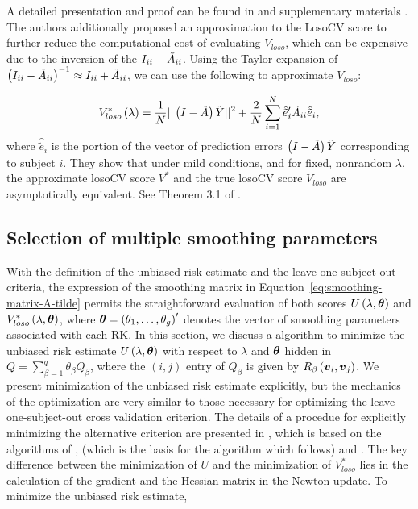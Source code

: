 A detailed presentation and proof can be found in \citet{xu2012asymptotic} and supplementary materials \citet{xuasymptotic}.  The authors additionally proposed an approximation to the LosoCV score to further reduce the computational cost of evaluating $V_{loso}$, which can be expensive due to the inversion of the $I_{ii} - \tilde{A}_{ii}$. Using the Taylor expansion of $\left(I_{ii} - \tilde{A}_{ii}\right)^{-1} \approx I_{ii} + \tilde{A}_{ii}$, we can use the following to approximate $V_{loso}$:

\begin{equation} \label{eq:approx-losocv}
V_{loso}^*\left( \lambda \right) = \frac{1}{N} \vert \vert \left(I - \tilde{A}\right)\tilde{Y} \vert \vert^2 + \frac{2}{N} \sum_{i = 1}^N \hat{\tilde{e}}'_{i}\tilde{A}_{ii}\hat{\tilde{e}}_i,
\end{equation}
\noindent
where $\hat{\tilde{e}}_i$ is the portion of the vector of prediction errors $\left(I - \tilde{A}\right)\tilde{Y}$ corresponding to subject $i$. They show that under mild conditions, and for fixed, nonrandom $\lambda$, the approximate losoCV score $V^*$ and the true losoCV score $V_{loso}$ are asymptotically equivalent. See Theorem 3.1 of \citet{xu2012asymptotic}.
  
\vspace{0.8in} 


\subsection{Selection of multiple smoothing parameters}

With the definition of the unbiased risk estimate and the leave-one-subject-out criteria, the expression of the smoothing matrix in Equation~\ref{eq:smoothing-matrix-A-tilde} permits the straightforward evaluation of both scores $U\left(\lambda, \mbox{\boldmath $\theta$} \right)$ and $V_{loso}^*\left(\lambda, \mbox{\boldmath $\theta$} \right)$, where $\mbox{\boldmath $\theta$} = \left(\theta_1,\dots, \theta_g\right)'$ denotes the vector of smoothing parameters associated with each RK.  In this section, we discuss a algorithm to minimize the unbiased risk estimate $U\left(\lambda, \mbox{\boldmath $\theta$}\right)$ with respect to $\lambda$ and $\mbox{\boldmath $\theta$}$ hidden in $Q = \sum_{\beta = 1}^q \theta_\beta Q_\beta$, where the $\left(i,j\right)$ entry of $Q_\beta$ is given by $R_\beta\left(\mbox{\boldmath $v$}_i,\mbox{\boldmath $v$}_j\right)$.  We present minimization of the unbiased risk estimate explicitly, but the mechanics of the optimization are very similar to those necessary for optimizing the leave-one-subject-out cross validation criterion. The details of a procedue for explicitly minimizing the alternative criterion are presented in \citet{xu2012asymptotic}, which is based on the algorithms of \citet{gu1991minimizing}, \citet{kim2004smoothing} (which is the basis for the algorithm which follows) and \citet{wood2004stable}. The key difference between the minimization of $U$ and the minimization of $V^*_{loso}$ lies in the calculation of the gradient and the Hessian matrix in the Newton update. To minimize the unbiased risk estimate,

